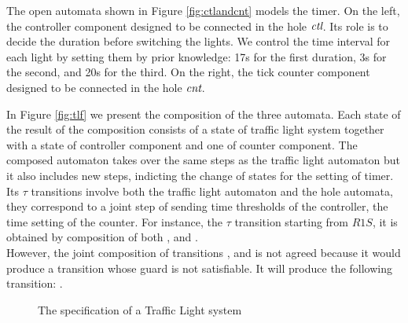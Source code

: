 \documentclass[runningheads]{llncs}
\newcommand{\symb}[1]{\makebox{\it #1}}
\begin{document}
The open automata shown in Figure  \ref{fig:ctlandcnt} models  the timer. On the left, the controller component designed to be connected in the hole $\symb{ctl}$.  Its role is to decide the duration before switching the lights. 
We control the time interval for each light by setting them by prior knowledge:  17s for the first duration, 3s for the second, and 20s for the third. On the right, the tick counter component designed to be connected in the hole $\symb{cnt}$.                                                                                                                                     




In Figure \ref{fig:tlf} we present the composition of the three automata. Each state of the result of the composition consists  of  a state of traffic light system together with a state of controller component and one of counter component. The composed automaton  takes over  the same steps as the traffic light automaton but it also includes new steps,  indicting the change of states for the setting of timer. Its $\tau$ transitions involve both the traffic light automaton and the hole  automata, they correspond to  a joint step of  sending time thresholds of the controller, the time setting of the counter. For instance, the  $\tau$  transition starting from \(R1S\), it is obtained by composition of both 
,  and   . \\ 
However, the joint composition of transitions  ,  and 
 is not agreed because it would produce a transition whose guard is not satisfiable. It will produce the following transition: .








\begin{figure}
\centering

\caption{The specification of a Traffic Light system}
\label{fig:tls}
\end{figure}
\end{document}
